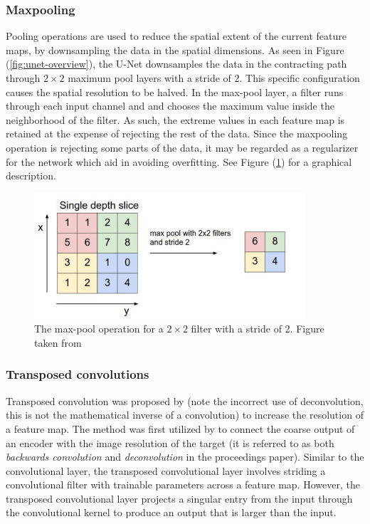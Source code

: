 \documentclass[../main/thesis.tex]{subfiles}
\begin{document}
\subsubsection{Maxpooling}
\label{sec:maxpool}
Pooling operations are used to reduce the spatial extent of the current feature maps, by downsampling the data in the spatial dimensions. As seen in Figure (\ref{fig:unet-overview}), the U-Net downsamples the data in the contracting path through $2 \times 2$ maximum pool layers with a stride of 2. This specific configuration causes the spatial resolution to be halved. In the max-pool layer, a filter runs through each input channel and and chooses the maximum value inside the neighborhood of the filter. As such, the extreme values in each feature map is retained at the expense of rejecting the rest of the data. Since the maxpooling operation is rejecting some parts of the data, it may be regarded as a regularizer for the network which aid in avoiding overfitting.  See Figure (\ref{fig:maxpool}) for a graphical description.

\begin{figure}
    \centering
    \includegraphics[width=0.9\textwidth]{The-MaxPool-operation}
    \caption{\label{fig:maxpool}The max-pool operation for a $2 \times 2$ filter with a stride of 2. Figure taken from \protect\citep{MihaiDaniel2020}}
\end{figure}

\subsubsection{Transposed convolutions}
\label{sec:tconv}
Transposed convolution was proposed by \citet{Zeiler2010} (note the incorrect use of deconvolution, this is not the mathematical inverse of a convolution) to increase the resolution of a feature map. The method was first utilized by \citet{Long2015} to connect the coarse output of an encoder with the image resolution of the target (it is referred to as both \textit{backwards convolution} and \textit{deconvolution} in the proceedings paper). Similar to the convolutional layer, the transposed convolutional layer involves striding a convolutional filter with trainable parameters across a feature map. However, the transposed convolutional layer projects a singular entry from the input through the convolutional kernel to produce an output that is larger than the input.
\end{document}
